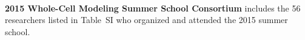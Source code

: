 \documentclass[journal,transmag]{IEEEtran}
\begin{document}
\begin{IEEEbiography}{}
~\\
~\\
~\\
~\\
~\\
~\\
~\\
~\\
~\\
~\\
~\\
\textbf{2015 Whole-Cell Modeling Summer School Consortium} includes the 56 researchers listed in Table~SI who organized and attended the 2015 summer school.
\end{IEEEbiography}



\vfill



\clearpage
\setcounter{table}{0}
\renewcommand{\thetable}{S\Roman{table}}
\end{document}
